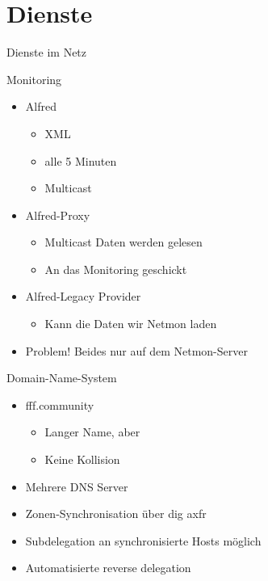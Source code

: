 \section{Dienste}
\begin{frame}{}
    \begin{center}
        Dienste im Netz
     \end{center}
\end{frame}

\begin{frame}{Monitoring}
    \begin{itemize}
        \item Alfred
        \begin{itemize}
            \item XML
            \item alle 5 Minuten
            \item Multicast
        \end{itemize}
        \item Alfred-Proxy
        \begin{itemize}
            \item Multicast Daten werden gelesen
            \item An das Monitoring geschickt
        \end{itemize}
        \item Alfred-Legacy Provider
        \begin{itemize}
            \item Kann die Daten wir Netmon laden
        \end{itemize}
    \item<2> {\color{red}Problem!} Beides nur auf dem Netmon-Server
    \end{itemize}
\end{frame}

\begin{frame}{Domain-Name-System}
    \begin{itemize}
        \item fff.community
        \begin{itemize}
            \item Langer Name, aber
            \item Keine Kollision
        \end{itemize}
        \item Mehrere DNS Server
        \item Zonen-Synchronisation über dig axfr
        \item Subdelegation an synchronisierte Hosts möglich
        \item Automatisierte reverse delegation
    \end{itemize}
\end{frame}

